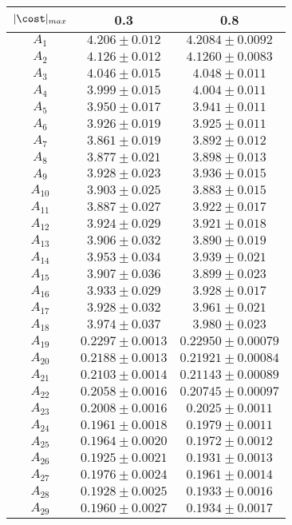 \begin{tabular}{c|c|c}
$|\cost|_{max}$ & 0.3 & 0.8\\
\hline
$A_1$ & $4.206\pm0.012$ & $4.2084\pm0.0092$ \\
$A_2$ & $4.126\pm0.012$ & $4.1260\pm0.0083$ \\
$A_3$ & $4.046\pm0.015$ & $4.048\pm0.011$ \\
$A_4$ & $3.999\pm0.015$ & $4.004\pm0.011$ \\
$A_5$ & $3.950\pm0.017$ & $3.941\pm0.011$ \\
$A_6$ & $3.926\pm0.019$ & $3.925\pm0.011$ \\
$A_7$ & $3.861\pm0.019$ & $3.892\pm0.012$ \\
$A_8$ & $3.877\pm0.021$ & $3.898\pm0.013$ \\
$A_9$ & $3.928\pm0.023$ & $3.936\pm0.015$ \\
$A_10$ & $3.903\pm0.025$ & $3.883\pm0.015$ \\
$A_11$ & $3.887\pm0.027$ & $3.922\pm0.017$ \\
$A_12$ & $3.924\pm0.029$ & $3.921\pm0.018$ \\
$A_13$ & $3.906\pm0.032$ & $3.890\pm0.019$ \\
$A_14$ & $3.953\pm0.034$ & $3.939\pm0.021$ \\
$A_15$ & $3.907\pm0.036$ & $3.899\pm0.023$ \\
$A_16$ & $3.933\pm0.029$ & $3.928\pm0.017$ \\
$A_17$ & $3.928\pm0.032$ & $3.961\pm0.021$ \\
$A_18$ & $3.974\pm0.037$ & $3.980\pm0.023$ \\
$A_19$ & $0.2297\pm0.0013$ & $0.22950\pm0.00079$ \\
$A_20$ & $0.2188\pm0.0013$ & $0.21921\pm0.00084$ \\
$A_21$ & $0.2103\pm0.0014$ & $0.21143\pm0.00089$ \\
$A_22$ & $0.2058\pm0.0016$ & $0.20745\pm0.00097$ \\
$A_23$ & $0.2008\pm0.0016$ & $0.2025\pm0.0011$ \\
$A_24$ & $0.1961\pm0.0018$ & $0.1979\pm0.0011$ \\
$A_25$ & $0.1964\pm0.0020$ & $0.1972\pm0.0012$ \\
$A_26$ & $0.1925\pm0.0021$ & $0.1931\pm0.0013$ \\
$A_27$ & $0.1976\pm0.0024$ & $0.1961\pm0.0014$ \\
$A_28$ & $0.1928\pm0.0025$ & $0.1933\pm0.0016$ \\
$A_29$ & $0.1960\pm0.0027$ & $0.1934\pm0.0017$ \\

\end{tabular}
